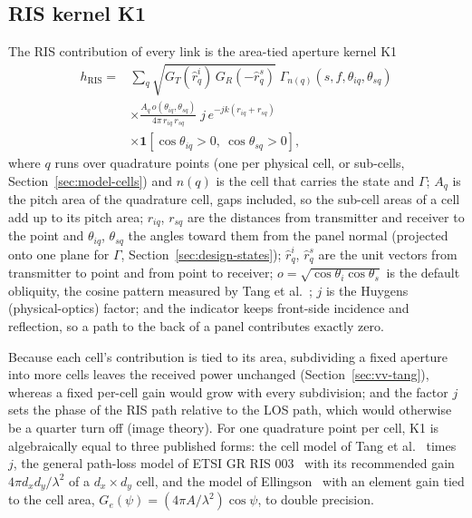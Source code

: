 \subsection{RIS kernel K1}\label{sec:model-k1}
The RIS contribution of every link is the area-tied aperture kernel K1
\begin{equation}
\begin{split}
h_{\mathrm{RIS}}={}&\sum_{q}\sqrt{G_T(\hat r^{i}_q)\,G_R(-\hat r^{s}_q)}\;
  \Gamma_{n(q)}(s,f,\theta_{iq},\theta_{sq})\\
&\times\frac{A_q\,o(\theta_{iq},\theta_{sq})}{4\pi\, r_{iq}\, r_{sq}}\;
  j\,e^{-jk(r_{iq}+r_{sq})}\\
&\times\mathbf{1}[\cos\theta_{iq}>0,\ \cos\theta_{sq}>0],
\end{split}
\label{eq:k1}
\end{equation}
where $q$ runs over quadrature points (one per physical cell, or sub-cells,
Section~\ref{sec:model-cells}) and $n(q)$ is the cell that carries the state and $\Gamma$;
$A_q$ is the pitch area of the quadrature cell, gaps included, so the sub-cell areas of a cell
add up to its pitch area; $r_{iq}$, $r_{sq}$ are the distances from transmitter and receiver to
the point and $\theta_{iq}$, $\theta_{sq}$ the angles toward them from the panel normal
(projected onto one plane for $\Gamma$, Section~\ref{sec:design-states});
$\hat r^i_q$, $\hat r^s_q$ are the unit vectors from transmitter to point and from point to
receiver; $o=\sqrt{\cos\theta_i\cos\theta_s}$ is the default obliquity, the cosine pattern
measured by Tang et al.~\cite{Tang2022mmWave}; $j$ is the Huygens (physical-optics) factor; and
the indicator keeps front-side incidence and reflection, so a path to the back of a panel
contributes exactly zero.

Because each cell's contribution is tied to its area, subdividing a fixed
aperture into more cells leaves the received power unchanged
(Section~\ref{sec:vv-tang}), whereas a fixed per-cell gain would grow with every subdivision;
and the factor $j$ sets the phase of the RIS path relative to the LOS path, which would
otherwise be a quarter turn off (image theory).
For one quadrature point per cell, K1 is algebraically equal to three
published forms: the cell model of Tang et al.~\cite{Tang2022mmWave} times $j$, the general
path-loss model of ETSI GR RIS 003~\cite[clause 6.3.1.2]{ETSI_GR_RIS003_v121} with its
recommended gain $4\pi d_xd_y/\lambda^2$ of a $d_x\times d_y$ cell, and the model of
Ellingson~\cite{Ellingson2021PathLoss} with an element gain tied to the cell area,
$G_e(\psi)=(4\pi A/\lambda^2)\cos\psi$, to double precision.

